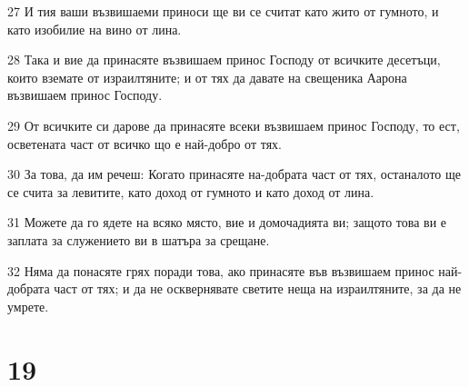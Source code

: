 \par 27 И тия ваши възвишаеми приноси ще ви се считат като жито от гумното, и като изобилие на вино от лина.
\par 28 Така и вие да принасяте възвишаем принос Господу от всичките десетъци, които вземате от израилтяните; и от тях да давате на свещеника Аарона възвишаем принос Господу.
\par 29 От всичките си дарове да принасяте всеки възвишаем принос Господу, то ест, осветената част от всичко що е най-добро от тях.
\par 30 За това, да им речеш: Когато принасяте на-добрата част от тях, останалото ще се счита за левитите, като доход от гумното и като доход от лина.
\par 31 Можете да го ядете на всяко място, вие и домочадията ви; защото това ви е заплата за служението ви в шатъра за срещане.
\par 32 Няма да понасяте грях поради това, ако принасяте във възвишаем принос най-добрата част от тях; и да не осквернявате светите неща на израилтяните, за да не умрете.

\chapter{19}

